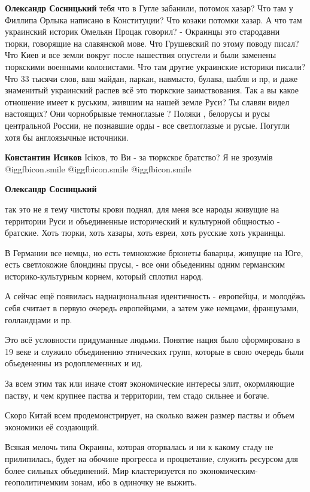 \begin{itemize}
\begin{itemize}
\textbf{Олександр Сосницький} тебя что в Гугле забанили, потомок хазар?
Что там у Филлипа Орлыка написано в Конституции? Что козаки потомки хазар.
А что там украинский историк Омельян Процак говорил?
- Окраинцы это стародавни тюрки, говорящие на славянской мове.
Что Грушевский по этому поводу писал? Что Киев и все земли вокруг после нашествия опустели и были заменены тюркскими военными колонистами.
Что там другие украинские историки писали? Что 33 тысячи слов, ваш майдан, паркан, навмысто, булава, шабля и пр, и даже знаменитый украинский распев всё это тюркские заимствования.
Так а вы какое отношение имеет к руським, жившим на нашей земле Руси?
Ты славян видел настоящих? Они чорнобрывые темноглазые ? Поляки , белорусы и русы центральной России, не познавшие орды - все светлоглазые и русые.
Погугли хотя бы англоязычные источники.

\textbf{Константин Исиков} Ісіков, то Ви - за тюркскоє братство? Я не зрозумів  @igg{fbicon.smile}   @igg{fbicon.smile}   @igg{fbicon.smile} 

\textbf{Олександр Сосницький} 

так это не я тему чистоты крови поднял, для меня все народы живущие на
территории Руси и объединенные исторический и культурной общностью - братские.
Хоть тюрки, хоть хазары, хоть евреи, хоть русские хоть украинцы.

В Германии все немцы, но есть темнокожие брюнеты баварцы, живущие на Юге, есть
светлокожие блондины прусы, - все они обьеденины одним германским
историко-культурным корнем, который сплотил народ.

А сейчас ещё появилась наднациональная идентичность - европейцы, и молодёжь
себя считает в первую очередь европейцами, а затем уже немцами, французами,
голландцами и пр.

Это всё условности придуманные людьми. Понятие нация было сформировано в 19
веке и служило объединению этнических групп, которые в свою очередь были
обьедененны из родоплеменных и ид.

За всем этим так или иначе стоят экономические интересы элит, окормляющие
паству, и чем крупнее паства и территории, тем стадо сильнее и богаче.

Скоро Китай всем продемонстрирует, на сколько важен размер паствы и объем
экономики её создающий.

Всякая мелочь типа Окраины, которая оторвалась и ни к какому стаду не
прилипилась, будет на обочине прогресса и процветание, служить ресурсом для
более сильных объединений. Мир кластеризуется по экономическим-геополитичемким
зонам, ибо в одиночку не выжить.


\end{itemize}
\end{itemize}
